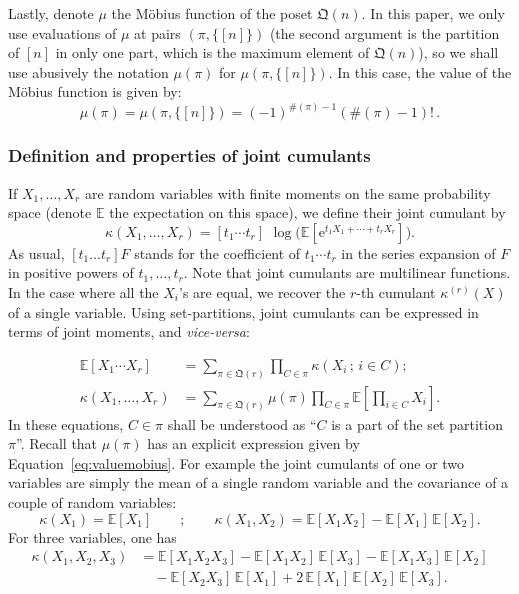 \documentclass[12pt,a4paper,reqno]{amsart}
\theoremstyle{remark}
\newcommand{\E}{\mathrm{e}}
\newcommand{\esper}{\mathbb{E}}
\newcommand{\qym}{\mathfrak{Q}}
\begin{document}
Lastly, denote $\mu$ the M\"obius function of the poset $\qym(n)$. In this paper, we only use evaluations of $\mu$ at pairs $(\pi,\{[n]\})$ (the second argument is the partition of $[n]$ in only one part, which is the maximum element of $\qym(n)$), so we shall use abusively the notation $\mu(\pi)$ for $\mu(\pi,\{[n]\})$.  In this case, the value of the M\"obius function is given by:
\begin{equation}\label{eq:valuemobius}
    \mu(\pi) = \mu(\pi, \{[n]\})=(-1)^{\#(\pi)-1} (\# (\pi)-1)!\,.
\end{equation}
\medskip

\subsubsection{Definition and properties of joint cumulants}
If $X_1, \ldots, X_r$ are random variables with finite moments on the same probability space (denote $\esper$ the expectation on this space), we define their joint cumulant by
\begin{equation}
    \kappa (X_1,\dots,X_r) = [t_1 \cdots t_r] \,\,\log 
    \bigg( \esper\!\left[ \E^{t_1 X_1 + \cdots + t_r X_r} \right] \bigg).
    \label{eq:defcumulant}
\end{equation}
As usual, $[t_1 \dots t_r] F$ stands for the coefficient of $t_1 \cdots t_r$  in the series expansion of $F$ in positive powers of $t_1, \dots, t_r$. Note that joint cumulants are multilinear functions. In the case where all the $X_i$'s are equal, we recover the $r$-th cumulant $\kappa^{(r)}(X)$ of a single variable. Using set-partitions, joint cumulants can be expressed in terms of joint moments, and {\em vice-versa}:

\begin{align}
    \esper [X_1 \cdots X_r] &= \sum_{\pi \in \qym(r)} \prod_{C \in \pi}
    \kappa(X_i\,;\, i \in C);
    \label{eq:cumulant2moment} \\
    \kappa (X_1,\dots,X_r) &= \sum_{\pi \in \qym(r)} \mu(\pi)
    \prod_{C \in \pi} \esper\!\left[ \prod_{i \in C} X_i \right].
    \label{eq:moment2cumulant}
\end{align}
In these equations, $C \in \pi$ shall be understood as ``$C$ is a part of the set partition $\pi$''. Recall that $\mu(\pi)$ has an explicit expression given by Equation~\eqref{eq:valuemobius}. For example the joint cumulants of one or two variables are simply the mean of a single random variable and the covariance of a couple of random variables:
$$\kappa(X_1)=\esper[X_1]\qquad;\qquad \kappa(X_1,X_2)=\esper[X_1 X_2] - \esper[X_1]\, \esper[X_2].$$
For three variables, one has
\begin{align*}
\kappa(X_1,X_2,X_3) &= \esper[X_1 X_2 X_3] - \esper[X_1 X_2]\, \esper[X_3] - \esper[X_1 X_3]\, \esper[X_2] \\
&\quad- \esper[X_2 X_3]\, \esper[X_1] +2\, \esper[X_1] \,\esper[X_2] \,\esper[X_3].
\end{align*}
\end{document}

